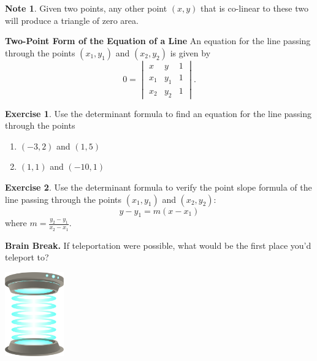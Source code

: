 \documentclass{beamer}
\newcommand{\ds}{\displaystyle}
\newcommand{\fn}{\insertframenumber}
\theoremstyle{definition}
\newtheorem{exercise}{Exercise}
\newtheorem*{nb}{Note}
\begin{document}
\begin{frame}{\fn}
	\begin{nb}
		Given two points, any other point $(x,y)$ that is co-linear to these two will produce a triangle of zero area.
	\end{nb}
	\begin{block}{\textbf{Two-Point Form of the Equation of a Line}}
		An equation for the line passing through the points $(x_1,y_1)$ and $(x_2,y_2)$ is given by	
			\[0=\begin{vmatrix}x&y&1\\x_1&y_1&1\\x_2&y_2&1\end{vmatrix}.\]
	\end{block}
	\begin{exercise}
		Use the determinant formula to find an equation for the line passing through the points
			\begin{enumerate}[label=(\alph*)]
				\item $(-3,2)$ and $(1,5)$
				\item $(1,1)$ and $(-10,1)$
			\end{enumerate}
	\end{exercise}
\end{frame}
\begin{frame}{\fn}
	\begin{exercise}
		Use the determinant formula to verify the point slope formula of the line passing through the points $(x_1,y_1)$ and $(x_2,y_2)$:
			\[y-y_1=m(x-x_1)\]
		where $\ds m=\frac{y_2-y_1}{x_2-x_1}$.
	\end{exercise}
\end{frame}

\begin{frame}{\fn}
	\begin{block}{\textbf{Brain Break.}}
		If teleportation were possible, what would be the first place you’d teleport to?
		\begin{center}
			\includegraphics[width=1in]{images/teleporter}
		\end{center}
	\end{block}
\end{frame}
\end{document}
